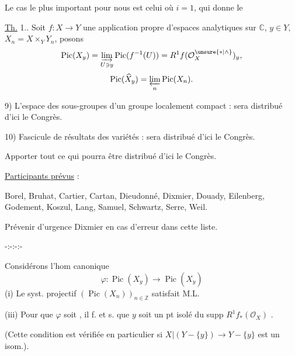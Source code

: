 Le cas le plus important pour nous est celui où $i=1$, qui donne le

\uline{Th.} 1.. Soit $f:X\longrightarrow Y$ une application propre d'espaces analytiques sur $\mathbb C$, $y\in Y$,  $X_n=X\times_Y Y_n$,  posons
\[
\operatorname{Pic}(X_y)=\varinjlim_{U\ni y}\operatorname{Pic}(f^{-1}(U))
=R^1f(\mathcal O_X^{\unsure{*|\wedge}})_y,
\]
\[
\operatorname{Pic}(\widehat X_y)=\varprojlim_n\operatorname{Pic}(X_n).
\]

9) L'espace des sous-groupes d'un groupe localement compact : sera distribué d'ici le Congrès.

10) Fascicule de résultats des variétés : sera distribué d'ici le Congrès.

Apporter tout ce qui pourra être distribué d'ici le Congrès.

\uline{Participants prévus} :

Borel, Bruhat, Cartier, Cartan, Dieudonné, Dixmier, Douady, Eilenberg, Godement, Koszul, Lang, Samuel, Schwartz, Serre, Weil.

Prévenir d'urgence Dixmier en cas d'erreur dans cette liste.

\begin{center}-:-:-:-\end{center}

Considérons l'hom canonique
\[
\varphi:\operatorname{Pic}(X_y)\longrightarrow\operatorname{Pic}(\widehat X_y)
\]
(i) Le syst. projectif $(\operatorname{Pic}(X_n))_{n\in\mathbb Z}$ satisfait M.L.


(iii) Pour que $\varphi$ soit , il f. et s. que $y$ soit un pt isolé du supp $R^1f_*(\mathcal O_X)$ .

(Cette condition est vérifiée en particulier si $X|(Y-\{y\})\longrightarrow Y-\{y\}$ est un isom.).


